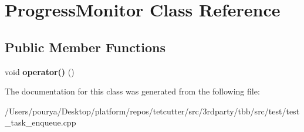 \hypertarget{classProgressMonitor}{}\section{Progress\+Monitor Class Reference}
\label{classProgressMonitor}
\subsection*{Public Member Functions}
\begin{DoxyCompactItemize}
\item 
\hypertarget{classProgressMonitor_af90eab28b7f9184ecda5d7b453a38ea0}{}void {\bfseries operator()} ()\label{classProgressMonitor_af90eab28b7f9184ecda5d7b453a38ea0}

\end{DoxyCompactItemize}


The documentation for this class was generated from the following file\+:\begin{DoxyCompactItemize}
\item 
/\+Users/pourya/\+Desktop/platform/repos/tetcutter/src/3rdparty/tbb/src/test/test\+\_\+task\+\_\+enqueue.\+cpp\end{DoxyCompactItemize}
